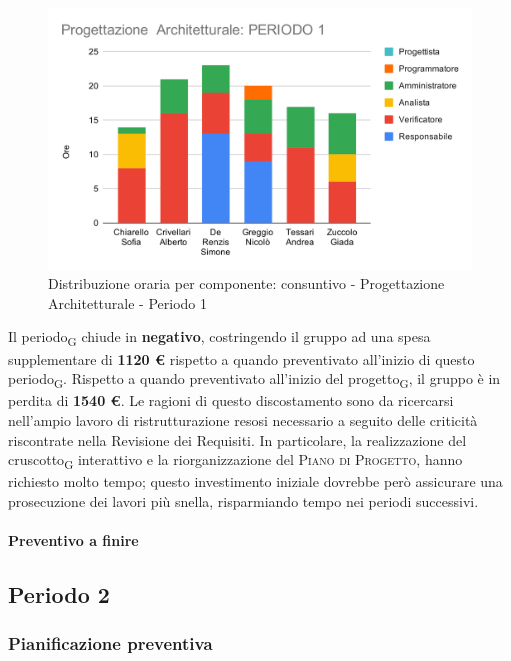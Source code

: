 \begin{figure}[H]
	\centering
	\includegraphics[scale=2]{res/images/charts/consuntivo/prog_arch_1.png}
	\caption{Distribuzione oraria per componente: consuntivo - Progettazione Architetturale - Periodo 1}
\end{figure}
\newpage
Il periodo\textsubscript{G} chiude in \textbf{negativo}, costringendo il gruppo ad una spesa supplementare di \textbf{1120 \euro} rispetto a quando preventivato all'inizio di questo periodo\textsubscript{G}. Rispetto a quando preventivato all'inizio del progetto\textsubscript{G}, il gruppo è in perdita di \textbf{1540 \euro}. Le ragioni di questo discostamento sono da ricercarsi nell'ampio lavoro di ristrutturazione resosi necessario a seguito delle criticità riscontrate nella Revisione dei Requisiti. In particolare, la realizzazione del cruscotto\textsubscript{G} interattivo e la riorganizzazione del \textsc{Piano di Progetto}, hanno richiesto molto tempo; questo investimento iniziale dovrebbe però assicurare una prosecuzione dei lavori più snella, risparmiando tempo nei periodi successivi.

\paragraph{Preventivo a finire}
\subparagraph*{}

\pafTable{
	
}



\pagebreak
\subsection{Periodo 2}

\subsubsection{Pianificazione preventiva}

